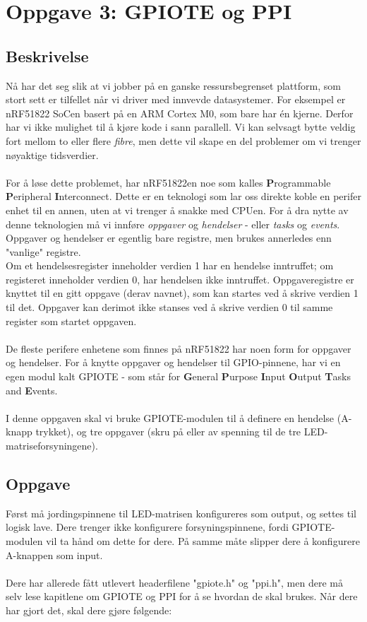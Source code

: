 \documentclass[11pt,a4paper]{article}
\begin{document}
\section{Oppgave 3: GPIOTE og PPI}
\subsection{Beskrivelse}
Nå har det seg slik at vi jobber på en ganske ressursbegrenset plattform, som stort sett er tilfellet når vi driver med innvevde datasystemer. For eksempel er nRF51822 SoCen basert på en ARM Cortex M0, som bare har én kjerne. Derfor har vi ikke mulighet til å kjøre kode i sann parallell. Vi kan selvsagt bytte veldig fort mellom to eller flere \textit{fibre}, men dette vil skape en del problemer om vi trenger nøyaktige tidsverdier.\\
\\
For å løse dette problemet, har nRF51822en noe som kalles \textbf{P}rogrammable \textbf{P}eripheral \textbf{I}nterconnect. Dette er en teknologi som lar oss direkte koble en perifer enhet til en annen, uten at vi trenger å snakke med CPUen. For å dra nytte av denne teknologien må vi innføre \textit{oppgaver} og \textit{hendelser} - eller \textit{tasks} og \textit{events}. Oppgaver og hendelser er egentlig bare registre, men brukes annerledes enn "vanlige" registre.\\
Om et hendelsesregister inneholder verdien 1 har en hendelse inntruffet; om registeret inneholder verdien 0, har hendelsen ikke inntruffet. Oppgaveregistre er knyttet til en gitt oppgave (derav navnet), som kan startes ved å skrive verdien 1 til det. Oppgaver kan derimot ikke stanses ved å skrive verdien 0 til samme register som startet oppgaven.\\
\\
De fleste perifere enhetene som finnes på nRF51822 har noen form for oppgaver og hendelser. For å knytte oppgaver og hendelser til GPIO-pinnene, har vi en egen modul kalt GPIOTE - som står for \textbf{G}eneral \textbf{P}urpose \textbf{I}nput \textbf{O}utput \textbf{T}asks and \textbf{E}vents.\\
\\
I denne oppgaven skal vi bruke GPIOTE-modulen til å definere en hendelse (A-knapp trykket), og tre oppgaver (skru på eller av spenning til de tre LED-matriseforsyningene).

\subsection{Oppgave}
Først må jordingspinnene til LED-matrisen konfigureres som output, og settes til logisk lave. Dere trenger ikke konfigurere forsyningspinnene, fordi GPIOTE-modulen vil ta hånd om dette for dere. På samme måte slipper dere å konfigurere A-knappen som input.\\
\\
Dere har allerede fått utlevert headerfilene "gpiote.h" og "ppi.h", men dere må selv lese kapitlene om GPIOTE og PPI for å se hvordan de skal brukes. Når dere har gjort det, skal dere gjøre følgende:
\end{document}
